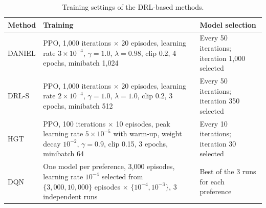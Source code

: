 \begin{table}
\centering
\begin{threeparttable}
\caption{Training settings of the DRL-based methods.}
\label{tab:v9-drltrain}
\footnotesize
\setlength{\tabcolsep}{4pt}
\begin{tabularx}{\textwidth}{@{}l>{\raggedright\arraybackslash}X>{\raggedright\arraybackslash}X@{}}
\toprule
Method & Training & Model selection \\
\midrule
DANIEL & PPO, 1{,}000 iterations $\times$ 20 episodes, learning rate $3\times10^{-4}$, $\gamma=1.0$, $\lambda=0.98$, clip 0.2, 4 epochs, minibatch 1{,}024 & Every 50 iterations; iteration 1{,}000 selected \\
DRL-S & PPO, 1{,}000 iterations $\times$ 20 episodes, learning rate $2\times10^{-4}$, $\gamma=1.0$, $\lambda=1.0$, clip 0.2, 3 epochs, minibatch 512 & Every 50 iterations; iteration 350 selected \\
HGT & PPO, 100 iterations $\times$ 10 episodes, peak learning rate $5\times10^{-5}$ with warm-up, weight decay $10^{-2}$, $\gamma=0.9$, clip 0.15, 3 epochs, minibatch 64 & Every 10 iterations; iteration 30 selected \\
DQN & One model per preference, 3{,}000 episodes, learning rate $10^{-4}$ selected from $\{3{,}000, 10{,}000\}$ episodes $\times$ $\{10^{-4},10^{-3}\}$, 3 independent runs & Best of the 3 runs for each preference \\
\bottomrule
\end{tabularx}
\end{threeparttable}
\end{table}
